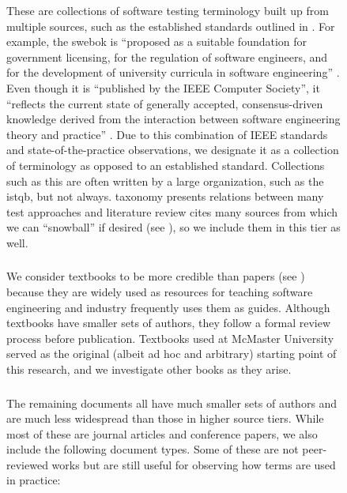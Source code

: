 \begin{figure}[t!]
These are collections of software testing terminology built up from multiple
sources, such as the established standards outlined in . For
example, the \acs{swebok} is ``proposed as a
suitable foundation for government licensing, for the regulation of software
engineers, and for the development of university curricula in software
engineering'' \citep[p.~xix]{KanerEtAl2011}. Even though it is ``published by
the IEEE Computer Society'', it ``reflects the current state of generally
accepted, consensus-driven knowledge derived from the interaction between
software engineering theory and practice'' \citep{AboutSWEBOK}. Due to this
combination of IEEE standards and state-of-the-practice observations, we
designate it as a collection of terminology as opposed to an established
standard. Collections such as this are often written by a large
organization, such as the \acf{istqb}, but not always. 
taxonomy presents relations between many test approaches and
 literature review cites many sources from which we can
``snowball'' if desired (see ), so we include them in this
tier as well.

\subsubsection{}\label{texts}

We consider textbooks to be more credible than papers (see )
because they are widely used as resources for teaching software engineering and
industry frequently uses them as guides. Although textbooks have smaller sets of
authors, they follow a formal review process before publication. Textbooks used
at McMaster University \citep{Patton2006,PetersAndPedrycz2000,vanVliet2000}
served as the original (albeit ad hoc and arbitrary) starting point of this
research, and we investigate other books as they arise. \addTextEx{}

\subsubsection{}\label{papers}

The remaining documents all have much smaller sets of authors and are much less
widespread than those in higher source tiers. While most of these are journal
articles and conference papers, we also include the following document types.
Some of these are not peer-reviewed works but are still useful for
observing how terms are used in practice: %


\end{figure}
